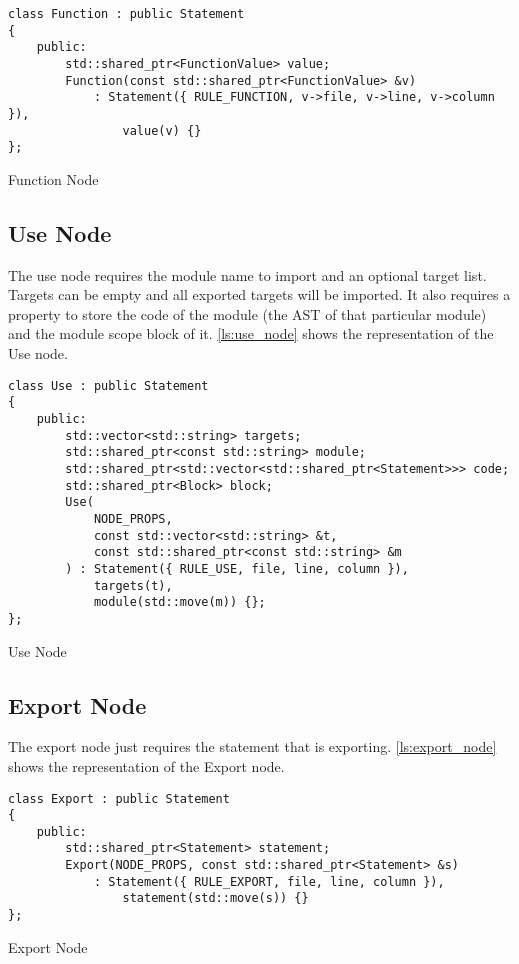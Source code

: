 \begin{listing}[H]
\begin{verbatim}
class Function : public Statement
{
    public:
        std::shared_ptr<FunctionValue> value;
        Function(const std::shared_ptr<FunctionValue> &v)
            : Statement({ RULE_FUNCTION, v->file, v->line, v->column }),
                value(v) {}
};
\end{verbatim}
\caption{Function Node}
\label{ls:function_node}
\end{listing}

\subsection{Use Node}

The use node requires the module name to import and an optional target list. Targets can be empty and all exported targets
will be imported. It also requires a property to store the code of the module (the AST of that particular module) and
the module scope block of it.
\autoref{ls:use_node} shows the representation of the Use node.

\begin{listing}[H]
\begin{verbatim}
class Use : public Statement
{
    public:
        std::vector<std::string> targets;
        std::shared_ptr<const std::string> module;
        std::shared_ptr<std::vector<std::shared_ptr<Statement>>> code;
        std::shared_ptr<Block> block;
        Use(
            NODE_PROPS,
            const std::vector<std::string> &t,
            const std::shared_ptr<const std::string> &m
        ) : Statement({ RULE_USE, file, line, column }),
            targets(t),
            module(std::move(m)) {};
};
\end{verbatim}
\caption{Use Node}
\label{ls:use_node}
\end{listing}

\subsection{Export Node}

The export node just requires the statement that is exporting.
\autoref{ls:export_node} shows the representation of the Export node.

\begin{listing}[H]
\begin{verbatim}
class Export : public Statement
{
    public:
        std::shared_ptr<Statement> statement;
        Export(NODE_PROPS, const std::shared_ptr<Statement> &s)
            : Statement({ RULE_EXPORT, file, line, column }),
                statement(std::move(s)) {}
};
\end{verbatim}
\caption{Export Node}
\label{ls:export_node}
\end{listing}

